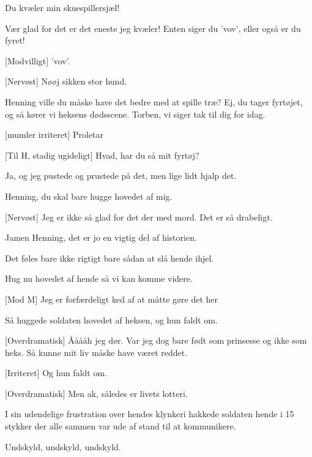 \documentclass[a4paper,11pt]{article}
\begin{document}
\begin{sketch}
 Du kvæler min skuespillersjæl!

 Vær glad for det er det eneste jeg kvæler! Enten siger du 'vov', eller også er du fyret!


[Modvilligt] 'vov'.

[Nervøst] Nøøj sikken stor hund. 

  Henning ville du måske have det bedre med at spille træ? Ej, du tager fyrtøjet, og så kører vi heksens dødsscene. Torben, vi siger tak til dig for idag. 

[mumler irriteret] Proletar 


[Til H, stadig ugideligt] Hvad, har du så mit fyrtøj?

 Ja, og jeg pustede og prustede på det, men lige lidt hjalp det.

 Henning, du skal bare hugge hovedet af mig.

[Nervøst] Jeg er ikke så glad for det der med mord. Det er så drabeligt. 

 Jamen Henning, det er jo en vigtig del af historien.

 Det føles bare ikke rigtigt bare sådan at slå hende ihjel.

 Hug nu hovedet af hende så vi kan komme videre.

[Mod M] Jeg er forfærdeligt ked af at måtte gøre det her


 Så huggede soldaten hovedet af heksen, og hun faldt om.


[Overdramatisk] Ååååh jeg dør. Var jeg dog bare født som prinsesse og ikke som heks. Så kunne mit liv måske have været reddet.

[Irriteret] Og hun faldt om.

[Overdramatisk] Men ak, således er livets lotteri.

 I sin udendelige frustration over hendes klynkeri hakkede soldaten hende i 15 stykker der alle sammen var ude af stand til at kommunikere.


  Undskyld, undskyld, undskyld.


\end{sketch}
\end{document}
